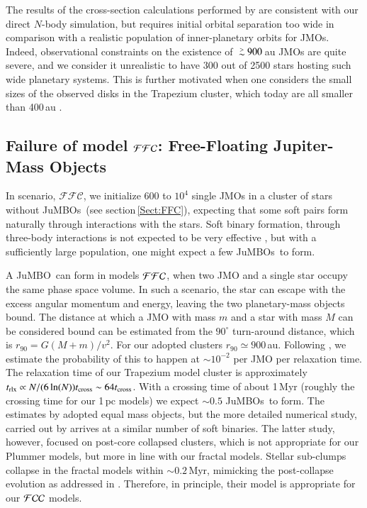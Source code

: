 \documentclass[submission,phys]{lib/SciPost}
\def\apgt{\ {\raise-.5ex\hbox{$\buildrel>\over\sim$}}\ }
\newcommand{\jumbo}{\mbox{JuMBO}}
\newcommand{\jumbos}{\mbox{JuMBOs}}
\begin{document}
The results of the cross-section calculations performed by
\cite{2023arXiv231006016W} are consistent with our direct $N$-body
simulation, but requires initial orbital separation too
wide in comparison with a realistic population of inner-planetary
orbits for JMOs. Indeed, observational constraints on the existence of
$\apgt 900$\,au JMOs are quite severe, and we consider it
unrealistic to have 300 out of 2500 stars hosting such wide
planetary systems. This is further motivated when one considers the small sizes
of the observed disks in the Trapezium cluster, which today are all
smaller than 400\,au \cite{2005A&A...441..195V}.


\subsection{Failure of model ${\cal FFC}$: Free-Floating Jupiter-Mass Objects}\label{sect:FFC_model_results}

In scenario, $\mathcal{FFC}$, we initialize $600$ to $10^4$ single
JMOs in a cluster of stars without \jumbos\, (see
section\,\ref{Sect:FFC}), expecting that some soft pairs form
naturally through interactions with the stars. Soft binary formation,
through three-body interactions is not expected to be very effective
\cite{1976A&A....53..259A}, but with a sufficiently large population,
one might expect a few \jumbos\, to form.

A \jumbo\, can form in models ${\cal FFC}$, when two JMO and a single
star occupy the same phase space volume. In such a scenario, the
star can escape with the excess angular momentum and energy, leaving
the two planetary-mass objects bound.  The distance at which a JMO with
mass $m$ and a star with mass $M$ can be considered bound can be
estimated from the $90^\circ$ turn-around distance, which is $r_{90} =
G(M+m)/v^2$.  For our adopted clusters $r_{90} \simeq
900$\,au. Following \cite{1976A&A....53..259A}, we estimate the
probability of this to happen at $\sim 10^{-2}$ per JMO per
relaxation time. The relaxation time of our Trapezium model cluster is
approximately $t_{\rm rlx} \propto N/(6\ln(N)) t_{\rm cross} \sim
64t_{\rm cross}$. With a crossing time of about 1\,Myr (roughly the
crossing time for our 1\,pc models) we expect $\sim 0.5$ \jumbos\, to
form. The estimates by \cite{1976A&A....53..259A} adopted equal mass
objects, but the more detailed numerical study, carried out by
\cite{2011MNRAS.415.1179M} arrives at a similar number of soft
binaries. The latter study, however, focused on post-core collapsed
clusters, which is not appropriate for our Plummer models, but more in
line with our fractal models. Stellar sub-clumps collapse in the
fractal models within $\sim 0.2$\,Myr, mimicking the post-collapse
evolution as addressed in \cite{2011MNRAS.415.1179M}. Therefore, in principle,
their model is appropriate for our ${\cal FCC}$ models.
\end{document}
